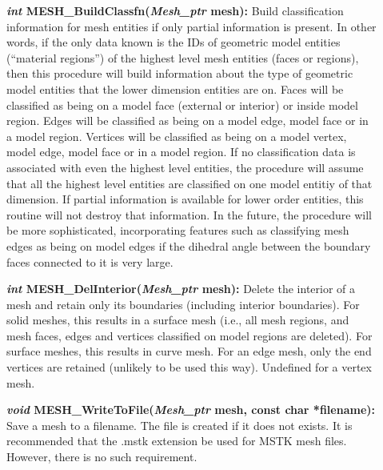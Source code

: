 \documentclass[12pt]{article}
\begin{document}
\begin{description}
  
\item[]\textbf{\textit{int} MESH\_BuildClassfn(\textit{Mesh\_ptr}
    mesh):} Build classification information for mesh entities if only
  partial information is present. In other words, if the only data
  known is the IDs of geometric model entities (``material regions'')
  of the highest level mesh entities (faces or regions), then this
  procedure will build information about the type of geometric model
  entities that the lower dimension entities are on. Faces will be
  classified as being on a model face (external or interior) or inside
  model region. Edges will be classified as being on a model edge,
  model face or in a model region. Vertices will be classified as
  being on a model vertex, model edge, model face or in a model
  region. If no classification data is associated with even the
  highest level entities, the procedure will assume that all the
  highest level entities are classified on one model entitiy of that
  dimension. If partial information is available for lower order
  entities, this routine will not destroy that information. In the
  future, the procedure will be more sophisticated, incorporating
  features such as classifying mesh edges as being on model edges if
  the dihedral angle between the boundary faces connected to it is
  very large.


\item[]\textbf{\textit{int} MESH\_DelInterior(\textit{Mesh\_ptr}
    mesh):} Delete the interior of a mesh and retain only its
    boundaries (including interior boundaries). For solid meshes, this
    results in a surface mesh (i.e., all mesh regions, and  mesh
    faces, edges and vertices classified on model regions are deleted). For
    surface meshes, this results in curve mesh. For an edge mesh, only
    the end vertices are retained (unlikely to be used this
    way). Undefined for a vertex mesh.
  
\item[]\textbf{\textit{void} MESH\_WriteToFile(\textit{Mesh\_ptr}
    mesh, const char *filename):} Save a mesh to a filename. The file
  is created if it does not exists. It is recommended that the .mstk
  extension be used for MSTK mesh files.  However, there is no such
  requirement.
  
  

\end{description}
\end{document}
